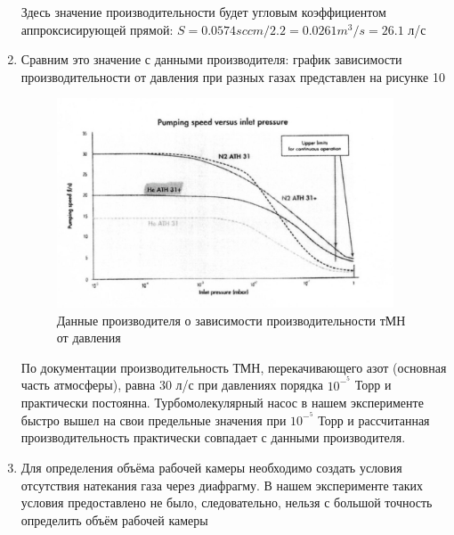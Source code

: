 \documentclass{article}
\begin{document}
\begin{enumerate}
Здесь значение производительности будет угловым коэффициентом аппроксисирующей прямой:
$S = 0.0574 sccm/2.2 = 0.0261 m^3/s = 26.1$ л/с

\item Сравним это значение с данными производителя: график зависимости производительности от давления при разных газах представлен на рисунке 10
  \begin{figure}[h]
    \centering
    \includegraphics[width=10cm]{man_data.jpg}
    \caption{Данные производителя о зависимости производительности тМН от давления}
    \label{fig:vac}
\end{figure}

По документации производительность ТМН, перекачивающего азот (основная часть атмосферы), равна 30 л/с при давлениях порядка $10^-^5$ Торр и практически постоянна. Турбомолекулярный насос в нашем эксперименте быстро вышел на свои предельные значения при $10^-^5$ Торр и рассчитанная производительность практически совпадает с данными производителя.

\item Для определения объёма рабочей камеры необходимо создать условия отсутствия натекания газа через диафрагму. В нашем эксперименте таких условия предоставлено не было, следовательно, нельзя с большой точность определить объём рабочей камеры
\end{enumerate}
\end{document}
